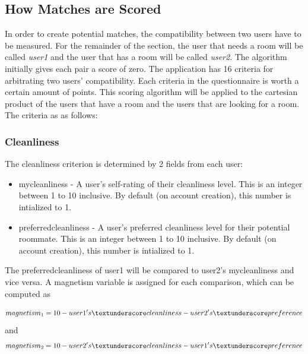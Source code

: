 \documentclass[journal]{IEEEtran}
\begin{document}
\subsection{How Matches are Scored}
In order to create potential matches, the compatibility between two users have to be measured. For the remainder of the
section, the user that needs a room will be called \textit{user1} and the user that has a room will be called
\textit{user2}. The algorithm initially gives each pair a score of zero. The application has 16 criteria for arbitrating
two users' compatibility. Each criteria in the questionnaire is worth a certain amount of points.  This scoring
algorithm will be applied to the cartesian product of the users that have a room and the users that are looking for a
room. The criteria as as follows:

    \subsubsection{Cleanliness}
        The cleanliness criterion is determined by 2 fields from each user:
        \begin{itemize}
                \item my\textunderscore cleanliness - A user's self-rating of their cleanliness level. This is an
                    integer between 1 to 10 inclusive. By default (on account creation), this number is intialized to 1.
                \item preferred\textunderscore cleanliness - A user's preferred cleanliness level for their
                    potential roommate. This is an integer between 1 to 10 inclusive. By default (on account creation),
                    this number is intialized to 1.

        \end{itemize}

        The preferred\textunderscore cleanliness of user1 will be compared to user2's my\textunderscore cleanliness and
        vice versa. A magnetism variable is assigned for each comparison, which can be computed as

        \begin{equation}
            magnetism_1 = 10-user1's\textunderscore cleanliness - user2's\textunderscore preference
        \end{equation}
        and
        \begin{equation}
            magnetism_2 = 10-user2's\textunderscore cleanliness - user1's\textunderscore preference
        \end{equation}
\end{document}
